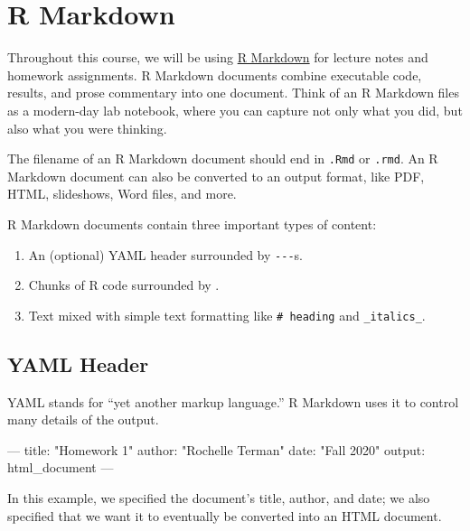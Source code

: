 \documentclass[
]{book}
\newenvironment{Shaded}{\begin{snugshade}}{\end{snugshade}}
\newcommand{\NormalTok}[1]{#1}
\providecommand{\tightlist}{%
  \setlength{\itemsep}{0pt}\setlength{\parskip}{0pt}}
\begin{document}
\hypertarget{r-markdown}{%
\section{R Markdown}\label{r-markdown}}

Throughout this course, we will be using \href{http://rmarkdown.rstudio.com\%3E}{R Markdown} for lecture notes and homework assignments. R Markdown documents combine executable code, results, and prose commentary into one document. Think of an R Markdown files as a modern-day lab notebook, where you can capture not only what you did, but also what you were thinking.

The filename of an R Markdown document should end in \texttt{.Rmd} or \texttt{.rmd}. An R Markdown document can also be converted to an output format, like PDF, HTML, slideshows, Word files, and more.

R Markdown documents contain three important types of content:

\begin{enumerate}
\def\labelenumi{\arabic{enumi}.}
\tightlist
\item
  An (optional) YAML header surrounded by \texttt{-\/-\/-}s.
\item
  Chunks of R code surrounded by \texttt{\textasciigrave{}\textasciigrave{}\textasciigrave{}}.
\item
  Text mixed with simple text formatting like \texttt{\#\ heading} and \texttt{\_italics\_}.
\end{enumerate}

\hypertarget{yaml-header}{%
\subsection{YAML Header}\label{yaml-header}}

YAML stands for ``yet another markup language.'' R Markdown uses it to control many details of the output.

\begin{Shaded}
\begin{Highlighting}[]
\NormalTok{---}
\NormalTok{title: "Homework 1"}
\NormalTok{author: "Rochelle Terman"}
\NormalTok{date: "Fall 2020"}
\NormalTok{output: html_document}
\NormalTok{---}
\end{Highlighting}
\end{Shaded}

In this example, we specified the document's title, author, and date; we also specified that we want it to eventually be converted into an HTML document.
\end{document}
